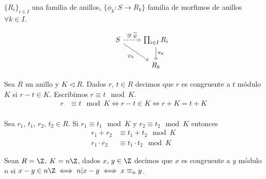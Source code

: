 \begin{prop}
    \(\{ R_i \}_{i \in I}\) una familia de anillos, \(\{ \phi_k : S \to R_k \}\) familia de morfimos de anillos \(\forall k \in I\).

    \[
        \begin{tikzcd}
            & S \arrow[dashed]{r}{\exists! \; \overline{\psi}} \arrow[swap]{dr}{\psi_k} & \prod_{i \in I} R_i \arrow{d}{\pi_k} \\
            & & R_k
        \end{tikzcd}
    \]
\end{prop}

Sea \(R\) un anillo y \(K \triangleleft R\). Dados \(r\), \(t \in R\) decimos que \(r\) es congruente a \(t\) módulo \(K\) si
\(r - t \in K\).
Escribimos \(r \equiv t \mod K\).
\begin{align*}
    r & \equiv t \mod K \iff r - t \in K \iff r + K = t + K \\
\end{align*}

Sea \(r_1\), \(t_1\), \(r_2\), \(t_2 \in R\). Si \(r_1 \equiv t_1 \mod K\) y \(r_2 \equiv t_2 \mod K\) entonces
\begin{align*}
    r_1 + r_2     & \equiv t_1 + t_2 \mod K     \\
    r_1 \cdot r_2 & \equiv t_1 \cdot t_2 \mod K
\end{align*}

\begin{eg}
    Sean \(R = \Z\), \(K = n \Z\), dados \(x\), \(y \in \Z\) decimos que \(x\) es congruente a \(y\) módulo \(n\) si
    \(x - y \in n \Z \iff n | x-y \iff x \equiv_n y\).
\end{eg}

